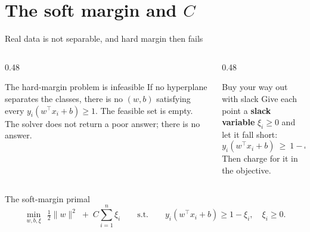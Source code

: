 \documentclass[aspectratio=169]{beamer}
\begin{document}
\section[Soft margin]{The soft margin and $C$}
\label{sec:soft}

\begin{frame}[shrink=5]{Real data is not separable, and hard margin then fails}
  \begin{columns}[T]
    \begin{column}{0.48\textwidth}
      \begin{alertblock}{The hard-margin problem is infeasible}
        If no hyperplane separates the classes, there is no $(w,b)$
        satisfying every $y_i(w^\top x_i + b)\ge 1$. The feasible set is
        empty. The solver does not return a poor answer; there is no answer.
      \end{alertblock}
    \end{column}
    \begin{column}{0.48\textwidth}
      \begin{block}{Buy your way out with slack}
        Give each point a \textbf{slack variable} $\xi_i \ge 0$ and let it
        fall short:
        \[
          y_i(w^\top x_i + b) \ \ge\ 1 - \xi_i .
        \]
        Then charge for it in the objective.
      \end{block}
    \end{column}
  \end{columns}
  \vspace{0.2em}
  \begin{exampleblock}{The soft-margin primal}
    \[
      \min_{w,b,\xi}\ \ \tfrac12\|w\|^2 \;+\; C\sum_{i=1}^{n}\xi_i
      \qquad\text{s.t.}\qquad
      y_i(w^\top x_i + b) \ge 1 - \xi_i,\quad \xi_i \ge 0 .
    \]
  \end{exampleblock}
\end{frame}
\end{document}

